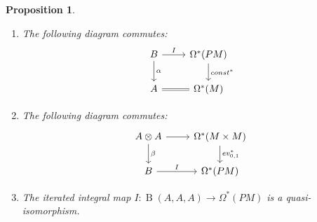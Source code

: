 \documentclass{scrartcl}
\theoremstyle{plain}
\newtheorem{proposition}[theorem]{Proposition}
\theoremstyle{definition}
\DeclareMathOperator{\BC}{B}
\begin{document}
\begin{proposition}\label{thm:path-models-0}
    \begin{enumerate}
    \item The following diagram commutes: 
    \begin{equation}\label{diag:path-models-0-1}
    \begin{tikzcd}
        B \rar["I"] \dar["\alpha"] & \Omega^*(PM) \dar["const^*"] \\
        A \rar[equal] & \Omega^*(M)
    \end{tikzcd}
    \end{equation}
    \item The following diagram commutes:
    \begin{equation}\label{diag:path-models-0-2}
        \begin{tikzcd}
        A \otimes A \rar \dar["\beta"] & \Omega^*(M\times M)\dar["ev_{0,1}^*"] \\
        B \rar["I"] & \Omega^*(PM)
        \end{tikzcd}
    \end{equation}
    \item The iterated integral map $I\colon \BC(A, A, A)\to \Omega^*(PM)$ is a quasi-isomorphism. 
\end{enumerate}
\end{proposition}
\end{document}
